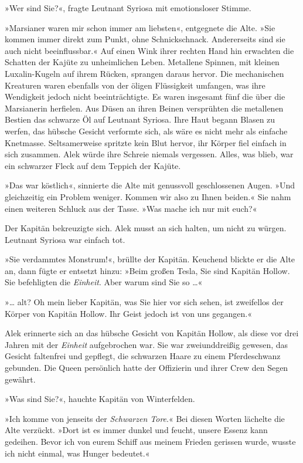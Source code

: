 »Wer sind Sie?«, fragte Leutnant Syriosa mit emotionsloser Stimme.

»Marsianer waren mir schon immer am liebsten«, entgegnete die Alte.
»Sie kommen immer direkt zum Punkt, ohne Schnickschnack.
Andererseits sind sie auch nicht beeinflussbar.« Auf einen Wink
ihrer rechten Hand hin erwachten die Schatten der Kajüte zu
unheimlichen Leben. Metallene Spinnen, mit kleinen Luxalin-Kugeln
auf ihrem Rücken, sprangen daraus hervor. Die mechanischen
Kreaturen waren ebenfalls von der öligen Flüssigkeit umfangen, was
ihre Wendigkeit jedoch nicht beeinträchtigte. Es waren insgesamt
fünf die über die Marsianerin herfielen. Aus Düsen an ihren Beinen
versprühten die metallenen Bestien das schwarze Öl auf Leutnant
Syriosa. Ihre Haut begann Blasen zu werfen, das hübsche Gesicht
verformte sich, als wäre es nicht mehr als einfache Knetmasse.
Seltsamerweise spritzte kein Blut hervor, ihr Körper fiel einfach
in sich zusammen. Alek würde ihre Schreie niemals vergessen. Alles,
was blieb, war ein schwarzer Fleck auf dem Teppich der Kajüte.

»Das war köstlich«, sinnierte die Alte mit genussvoll geschlossenen
Augen. »Und gleichzeitig ein Problem weniger. Kommen wir also zu
Ihnen beiden.« Sie nahm einen weiteren Schluck aus der Tasse. »Was
mache ich nur mit euch?«

Der Kapitän bekreuzigte sich. Alek musst an sich halten, um nicht
zu würgen. Leutnant Syriosa war einfach tot.

»Sie verdammtes Monstrum!«, brüllte der Kapitän. Keuchend blickte
er die Alte an, dann fügte er entsetzt hinzu: »Beim großen Tesla,
Sie sind Kapitän Hollow. Sie befehligten die \textit{Einheit}. Aber warum
sind Sie so \ldots{}«

»\ldots{} alt? Oh mein lieber Kapitän, was Sie hier vor sich sehen, ist
zweifellos der Körper von Kapitän Hollow. Ihr Geist jedoch ist von
uns gegangen.«

\bigpar

Alek erinnerte sich an das hübsche Gesicht von Kapitän Hollow, als
diese vor drei Jahren mit der \textit{Einheit} aufgebrochen war. Sie war
zweiunddreißig gewesen, das Gesicht faltenfrei und gepflegt, die
schwarzen Haare zu einem Pferdeschwanz gebunden. Die Queen
persönlich hatte der Offizierin und ihrer Crew den Segen gewährt.

»Was sind Sie?«, hauchte Kapitän von Winterfelden.

»Ich komme von jenseits der \textit{Schwarzen Tore}.« Bei diesen Worten
lächelte die Alte verzückt. »Dort ist es immer dunkel und feucht,
unsere Essenz kann gedeihen. Bevor ich von eurem Schiff aus meinem
Frieden gerissen wurde, wusste ich nicht einmal, was Hunger
bedeutet.«

